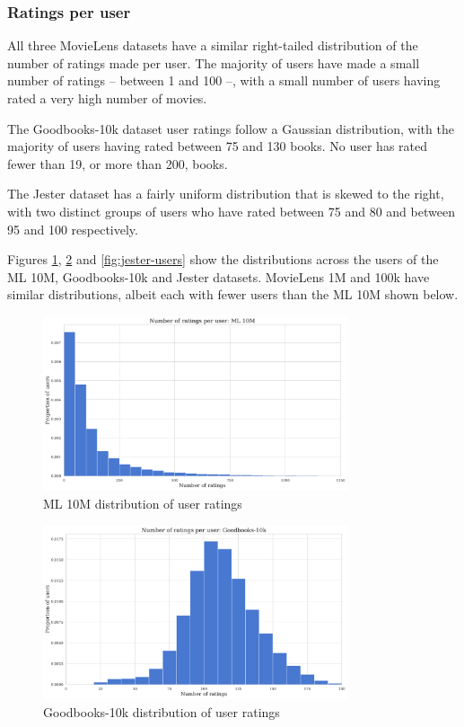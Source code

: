 \subsubsection{Ratings per user}
All three MovieLens datasets have a similar right-tailed distribution of the number of ratings made per user. The majority of users have made a small number of ratings -- between 1 and 100 --, with a small number of users having rated a very high number of movies.

The Goodbooks-10k dataset user ratings follow a Gaussian distribution, with the majority of users having rated between 75 and 130 books. No user has rated fewer than 19, or more than 200, books.

The Jester dataset has a fairly uniform distribution that is skewed to the right, with two distinct groups of users who have rated between 75 and 80 and between 95 and 100 respectively.

Figures \ref{fig:ML10M-users}, \ref{fig:goodbooks-users} and \ref{fig:jester-users} show the distributions across the users of the ML 10M, Goodbooks-10k and Jester datasets. MovieLens 1M and 100k have similar distributions, albeit each with fewer users than the ML 10M shown below.

\begin{figure}[H]
\centering
\includegraphics[width=0.8\textwidth]{Figures/3_ratings-distributions/ml_10m_user-ratings.pdf}
\caption{ML 10M distribution of user ratings}
\label{fig:ML10M-users}
\end{figure}

\begin{figure}[H]
\centering
\includegraphics[width=0.8\textwidth]{Figures/3_ratings-distributions/goodbooks_user-ratings.pdf}
\caption{Goodbooks-10k distribution of user ratings}
\label{fig:goodbooks-users}
\end{figure}

